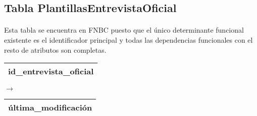 \subsection{Tabla PlantillasEntrevistaOficial}

  \paragraph{}Esta tabla se encuentra en FNBC puesto que el único determinante
  funcional existente es el identificador principal y todas las dependencias
  funcionales con el resto de atributos son completas.

  \begin{center}
    \begin{minipage}{3.9cm}{\begin{flushright}\begin{tabular}{ | c | }
                  \hline
                  id\_entrevista\_oficial \\
                  \hline
                 \end{tabular}\end{flushright} }
    \end{minipage}
    \begin{minipage}{0.7cm}{$\longrightarrow$}
    \end{minipage}
    \begin{minipage}{5.9cm}{\begin{tabular}{ | c | }
                  \hline
                  última\_modificación \\
                  \hline
                 \end{tabular} }
    \end{minipage}
  \end{center}
